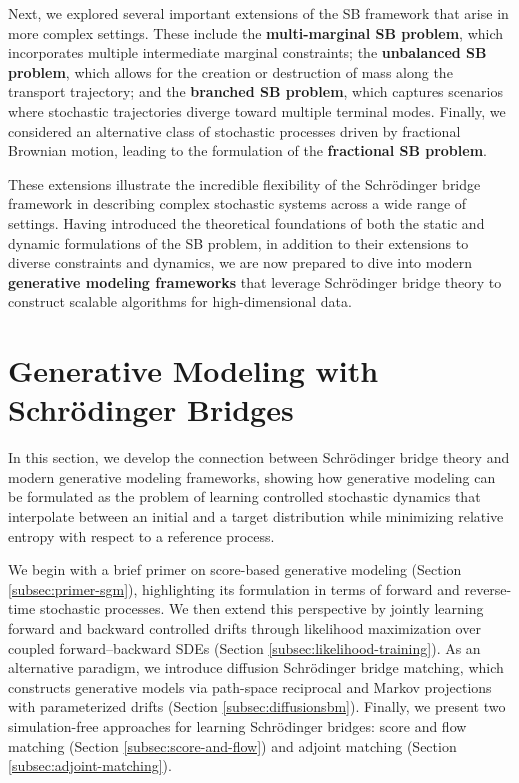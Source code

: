 \documentclass{article}
\begin{document}
Next, we explored several important extensions of the SB framework that arise in more complex settings. These include the \textbf{multi-marginal SB problem}, which incorporates multiple intermediate marginal constraints; the \textbf{unbalanced SB problem}, which allows for the creation or destruction of mass along the transport trajectory; and the \textbf{branched SB problem}, which captures scenarios where stochastic trajectories diverge toward multiple terminal modes. Finally, we considered an alternative class of stochastic processes driven by fractional Brownian motion, leading to the formulation of the \textbf{fractional SB problem}.

These extensions illustrate the incredible flexibility of the Schrödinger bridge framework in describing complex stochastic systems across a wide range of settings. Having introduced the theoretical foundations of both the static and dynamic formulations of the SB problem, in addition to their extensions to diverse constraints and dynamics, we are now prepared to dive into modern \textbf{generative modeling frameworks} that leverage Schrödinger bridge theory to construct scalable algorithms for high-dimensional data.

\newpage 
\section{Generative Modeling with Schrödinger Bridges}
\label{sec:generative-modeling}

In this section, we develop the connection between Schrödinger bridge theory and modern generative modeling frameworks, showing how generative modeling can be formulated as the problem of learning controlled stochastic dynamics that interpolate between an initial and a target distribution while minimizing relative entropy with respect to a reference process.

We begin with a brief primer on score-based generative modeling (Section \ref{subsec:primer-sgm}), highlighting its formulation in terms of forward and reverse-time stochastic processes. We then extend this perspective by jointly learning forward and backward controlled drifts through likelihood maximization over coupled forward–backward SDEs (Section \ref{subsec:likelihood-training}). As an alternative paradigm, we introduce diffusion Schrödinger bridge matching, which constructs generative models via path-space reciprocal and Markov projections with parameterized drifts (Section \ref{subsec:diffusionsbm}). Finally, we present two simulation-free approaches for learning Schrödinger bridges: score and flow matching (Section \ref{subsec:score-and-flow}) and adjoint matching (Section \ref{subsec:adjoint-matching}).
\end{document}
